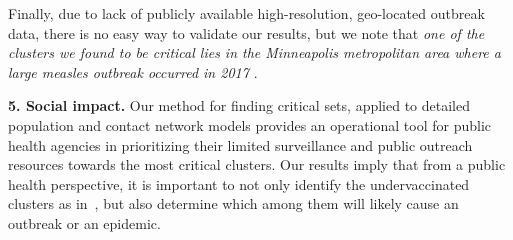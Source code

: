 Finally, due to lack of publicly available high-resolution, geo-located outbreak data, there is no easy way to validate our results, but we note that \emph{one of the clusters we found to be critical lies in the Minneapolis metropolitan area where a large measles outbreak occurred in 2017 \cite{hall:mmwr17}}.

\noindent
\textbf{5. Social impact.}
Our method for finding critical sets, applied to detailed population and contact network models provides an operational tool for public health agencies in prioritizing their limited surveillance and public outreach resources towards the most critical clusters.
Our results imply that from a public health perspective, it is important to not only identify the undervaccinated clusters
as in~\cite{cadena:vacc-cluster}, but also determine which among them will likely cause an outbreak or an epidemic.






